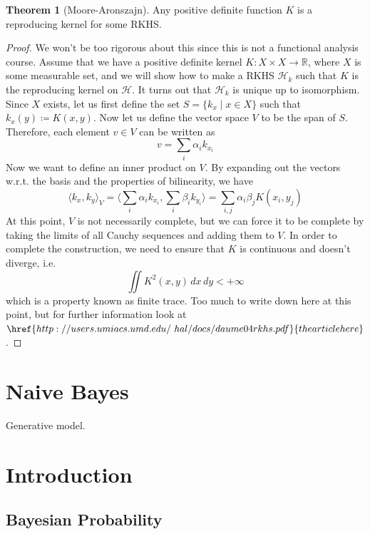 \documentclass{article}
\theoremstyle{definition}
\newtheorem{theorem}{Theorem}[section]
\begin{document}
  \begin{theorem}[Moore-Aronszajn] 
    Any positive definite function $K$ is a reproducing kernel for some RKHS.  
  \end{theorem} 
  \begin{proof} 
    We won't be too rigorous about this since this is not a functional analysis course. Assume that we have a positive definite kernel $K: X \times X \rightarrow \mathbb{R}$, where $X$ is some measurable set, and we will show how to make a RKHS $\mathcal{H}_k$ such that $K$ is the reproducing kernel on $\mathcal{H}$. It turns out that $\mathcal{H}_k$ is unique up to isomorphism. Since $X$ exists, let us first define the set $S = \{ k_x \mid x \in X\}$ such that $k_x (y) \coloneqq K(x, y)$. Now let us define the vector space $V$ to be the span of $S$. Therefore, each element $v \in V$ can be written as 
    \[v = \sum_i \alpha_i k_{x_i}\]
    Now we want to define an inner product on $V$. By expanding out the vectors w.r.t. the basis and the properties of bilinearity, we have 
    \[\langle k_x, k_y \rangle_{V} = \bigg\langle \sum_i \alpha_i k_{x_i} , \sum_i \beta_i k_{y_i} \bigg\rangle = \sum_{i, j} \alpha_i \beta_j K(x_i, y_j)\] 
    At this point, $V$ is not necessarily complete, but we can force it to be complete by taking the limits of all Cauchy sequences and adding them to $V$. In order to complete the construction, we need to ensure that $K$ is continuous and doesn't diverge, i.e. 
    \[\iint K^2 (x, y) \,dx\,dy < +\infty\]
    which is a property known as finite trace. Too much to write down here at this point, but for further information look at $\href{http://users.umiacs.umd.edu/~hal/docs/daume04rkhs.pdf}{the article here}$. 
  \end{proof}

\section{Naive Bayes}

  Generative model. 

\section{Introduction}

\subsection{Bayesian Probability}
\end{document}
